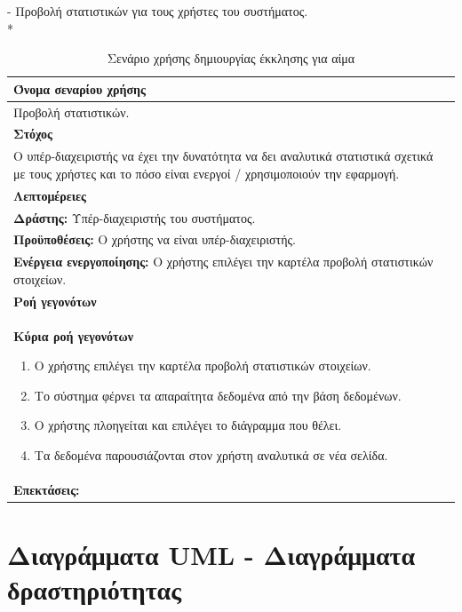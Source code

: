 \newpage
- Προβολή στατιστικών για τους χρήστες του συστήματος.
\\*		
\begin{table}[H]
	\begin{center}
	    \begin{tabular}{|p{\dimexpr \linewidth-2\tabcolsep}|}
	    \hline
	    \rowcolor{grayy}
	    \textbf{Όνομα σεναρίου χρήσης}
	    \\ \hline    
	    Προβολή στατιστικών.
	     \\ \hline
	    \rowcolor{grayy}
	    \textbf{\textbf{Στόχος}}
	    \\ \hline
	 	 Ο υπέρ-διαχειριστής να έχει την δυνατότητα να δει αναλυτικά στατιστικά σχετικά με τους χρήστες και το πόσο είναι ενεργοί / χρησιμοποιούν την εφαρμογή. 
	    \\ \hline
	    \rowcolor{grayy}
	    \textbf{Λεπτομέρειες}
	    \\ \hline
		\textbf{Δράστης:} Υπέρ-διαχειριστής του συστήματος.
		\\*
		\textbf{Προϋποθέσεις:} Ο χρήστης να είναι υπέρ-διαχειριστής.
		\\*
		\textbf{Ενέργεια ενεργοποίησης:} Ο χρήστης επιλέγει την καρτέλα προβολή στατιστικών στοιχείων.
		\\ \hline
		\rowcolor{grayy}    
	    \textbf{Ροή γεγονότων}
	    \\ \hline
		\textbf{Κύρια ροή γεγονότων}
		\begin{enumerate}
		\item	 Ο χρήστης επιλέγει την καρτέλα προβολή στατιστικών στοιχείων.
		\item Το σύστημα φέρνει τα απαραίτητα δεδομένα από την βάση δεδομένων.
		\item Ο χρήστης πλοηγείται και επιλέγει το διάγραμμα που θέλει.
		\item Τα δεδομένα παρουσιάζονται στον χρήστη αναλυτικά  σε νέα σελίδα.
		\end{enumerate}
		\\ \hline
		\rowcolor{grayy}
		\textbf{Επεκτάσεις:}
		   \\ \hline
	    \end{tabular}
	    \caption{Σενάριο χρήσης δημιουργίας έκκλησης για αίμα}
	    \label{tab:view_analytics} 
	\end{center}
\end{table}

\section{Διαγράμματα UML - Διαγράμματα δραστηριότητας}

